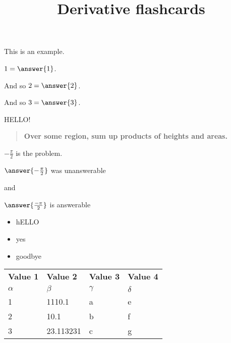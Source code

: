 \documentclass{ximera}
\title{Derivative flashcards}
\begin{document}
\begin{example}
  This is an example.

  $1 = \answer{1}$.
  
  \begin{problem}
    And so $2 = \answer{2}$.
  \end{problem}

  \begin{problem}
    And so $3 = \answer{3}$.
  \end{problem}
  
  \begin{hint}
    HELLO!
  \end{hint}  
\end{example}

\begin{quote}
\textbf{Over \textcolor{red!50!black}{some region},
\textcolor{green!70!black!70!blue}{sum up} products of
\textcolor{purple!50!blue!90!black}{heights} and \textcolor{blue!70!green}{areas}.}
\end{quote}

\begin{problem}
  $-\frac{\pi}{2}$ is the problem.
  
  $\answer{-\frac{\pi}{2}}$ was unanswerable

and

$\answer{\frac{-\pi}{2}}$ is answerable
\end{problem}

\begin{itemize}
\item hELLO
\item yes
\item goodbye
\end{itemize}
\begin{exploration}
    \begin{tabular}{l|l|ll}
      \textbf{Value 1} & \textbf{Value 2} & \textbf{Value 3} & \textbf{Value 4}\\ %
      $\alpha$ & $\beta$ & $\gamma$ & $\delta$ \\ %
      \hline
      1 & 1110.1 & a & e\\ 
      2 & 10.1 & b & f\\ 
      3 & 23.113231 & c & g\\ 
    \end{tabular}
    \end{exploration}
\end{document}

